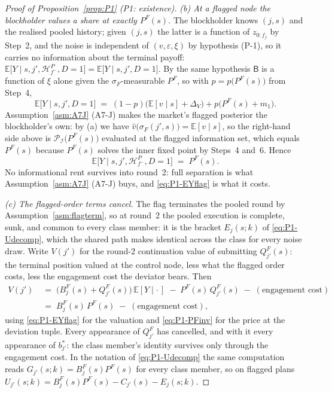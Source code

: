 \documentclass[11pt]{article}
\newcommand{\Eop}{\mathbb{E}}
\begin{document}
\begin{proof}[Proof of Proposition~\ref{prop:P1} (P1: existence)]
\emph{(b) At a flagged node the blockholder values a share at exactly $P^F(s)$.} The blockholder
knows $(j,s)$ and the realised pooled history; given $(j,s)$ the latter is a function of
$z_{0:f_j}$ by Step~2, and the noise is independent of $(v,\varepsilon,\xi)$ by hypothesis (P-1), so
it carries no information about the terminal payoff:
$\Eop\bigl[Y \mid s,j',\mathcal H_{f^-}^P,D=1\bigr] = \Eop\bigl[Y \mid s,j',D=1\bigr]$. By the same
hypothesis $\mathsf B$ is a function of $\xi$ alone given the $\sigma_F$-measurable $P^F$, so with
$p = p\bigl(P^F(s)\bigr)$ from Step~4,
\[
\Eop\bigl[Y \mid s,j',D=1\bigr]
\;=\; (1-p)\bigl(\Eop[v \mid s] + \Delta_V\bigr) + p\bigl(P^F(s)+m_1\bigr).
\]
Assumption~\ref{asm:A7J} (A7-J) makes the market's flagged posterior the blockholder's own: by (a) we
have $\hat v\bigl(\sigma_F(j',s)\bigr) = \Eop[v \mid s]$, so the right-hand side above is
$\mathcal P_{\mathcal I}\bigl(P^F(s)\bigr)$ evaluated at the flagged information set, which equals
$P^F(s)$ because $P^F(s)$ solves the inner fixed point by Steps~4 and~6. Hence
\begin{equation}
\label{eq:P1-EYflag}
\Eop\bigl[Y \mid s,j',\mathcal H_{f^-}^P,D=1\bigr] \;=\; P^F(s).
\end{equation}
No informational rent survives into round~2: full separation is what Assumption~\ref{asm:A7J} (A7-J) buys,
and \eqref{eq:P1-EYflag} is what it costs.

\emph{(c) The flagged-order terms cancel.} The flag terminates the pooled round by
Assumption~\ref{asm:flagterm}, so at round~2 the pooled execution is complete, sunk, and common to
every class member: it is the bracket $E_j(s;k)$ of \eqref{eq:P1-Udecomp}, which the shared path
makes identical across the class for every noise draw. Write $V(j')$ for the round-2 continuation
value of submitting $Q_{j'}^F(s)$: the terminal position valued at the control node, less what the
flagged order costs, less the engagement cost the deviator bears. Then
\begin{equation}
\label{eq:P1-Vcancel}
\begin{aligned}
V(j')
&\;=\; \bigl(B_j^F(s)+Q_{j'}^F(s)\bigr)\,\Eop[Y \mid \cdot\,]
\;-\; P^F(s)\,Q_{j'}^F(s) \;-\; (\text{engagement cost})\\[2pt]
&\;=\; B_j^F(s)\,P^F(s) \;-\; (\text{engagement cost}),
\end{aligned}
\end{equation}
using \eqref{eq:P1-EYflag} for the valuation and \eqref{eq:P1-PFinv} for the price at the deviation
tuple. Every appearance of $Q_{j'}^F$ has cancelled, and with it every appearance of $b_{j'}^*$: the
class member's identity survives only through the engagement cost. In the notation of
\eqref{eq:P1-Udecomp} the same computation reads $G_{j'}(s;k) = B_j^F(s)P^F(s)$ for every class
member, so on flagged plans $U_{j'}(s;k) = B_j^F(s)P^F(s) - C_{j'}(s) - E_j(s;k)$.


\end{proof}
\end{document}
